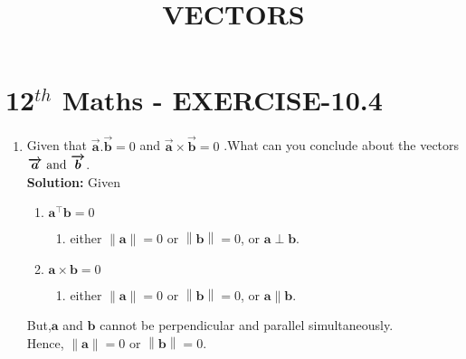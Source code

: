 \documentclass[10pt]{article}
\newcommand{\solution}{\noindent \textbf{Solution: }}
\providecommand{\norm}[1]{\left\lVert#1\right\rVert}
\let\vec\mathbf{}
\begin{document}
\begin{center}
\title{\textbf{VECTORS}}
\date{\vspace{-5ex}} %
\maketitle
\end{center}

\section{12$^{th}$ Maths - EXERCISE-10.4}

\begin{enumerate}
\item Given that $\boldsymbol{\overrightarrow{a}.\overrightarrow{b}}=0$ and $\boldsymbol{\overrightarrow{a}\times\overrightarrow{b}}=0$ .What can you conclude about the vectors $\boldsymbol{\overrightarrow{a}$ and $\overrightarrow{b}}$.\\  

\solution
Given  

\begin{enumerate}
\item $\vec{a}^{\top}\vec{b}=0$
\begin{enumerate}
\item either $\norm{\vec{a}}=0$ or $\norm{\vec{b}}=0$, or $\vec{a}\perp\vec{b}$.
\end{enumerate}
\item $\vec{a}\times\vec{b}=0$
\begin{enumerate}
\item either $\norm{\vec{a}}=0$ or $\norm{\vec{b}}=0$, or $\vec{a}\parallel\vec{b}$.
\end{enumerate}
\end{enumerate}
But,$\vec{a}$ and $\vec{b}$ cannot be perpendicular and parallel simultaneously.\\
Hence, $\norm{\vec{a}}=0$ or $\norm{\vec{b}}=0$.

\end{enumerate}
\end{document}
